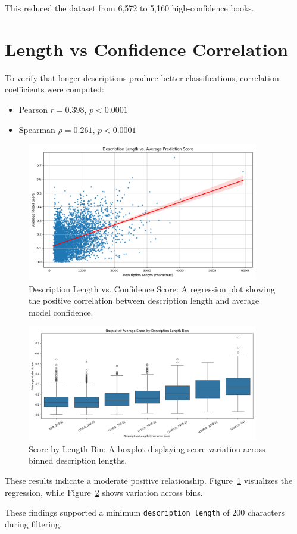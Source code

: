 This reduced the dataset from 6,572 to 5,160 high-confidence books.

\section{Length vs Confidence Correlation}
To verify that longer descriptions produce better classifications, correlation coefficients were computed:
\begin{itemize}
    \item Pearson $r = 0.398$, $p < 0.0001$
    \item Spearman $\rho = 0.261$, $p < 0.0001$
\end{itemize}

\begin{figure}[H]
    \centering
    \includegraphics[width=0.9\textwidth]{figures/category_refined_description_length_vs_avg_score.png}
    \caption{Description Length vs. Confidence Score: A regression plot showing the positive correlation between description length and average model confidence.}
    \label{fig:category_refined_description_length_vs_avg_score}
\end{figure}

\begin{figure}[H]
    \centering
    \includegraphics[width=0.9\textwidth]{figures/category_refined_avg_score_by_length_bin.png}
    \caption{Score by Length Bin: A boxplot displaying score variation across binned description lengths.}
    \label{fig:category_refined_avg_score_by_length_bin}
\end{figure}

These results indicate a moderate positive relationship. Figure~\ref{fig:category_refined_description_length_vs_avg_score} visualizes the regression, while Figure~\ref{fig:category_refined_avg_score_by_length_bin} shows variation across bins.

These findings supported a minimum \texttt{description\_length} of 200 characters during filtering.